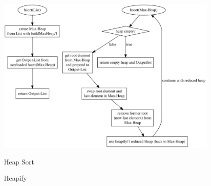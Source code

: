 \begin{figure}[hbt]
    \caption{Heap Sort}
    \centering
    \includegraphics[width = 11cm]{hsort.pdf}\label{fig:hsort}
\end{figure}

\begin{figure}[hbp]
    \caption{Heapify}
    \centering

\end{figure}


